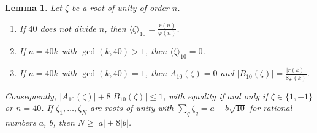 \documentclass[leqno]{article}
\renewcommand{\leq}{\ensuremath{\leqslant}}
\renewcommand{\geq}{\ensuremath{\geqslant}}
\newtheorem{lemma}[thm]{Lemma}
\numberwithin{equation}{section}
\begin{document}
\begin{lemma}
\label{lem:galois-average}
Let $\zeta$ be a root of unity of order $n$.
\begin{enumerate}
\item If $40$ does not divide $n$, then $\langle\zeta\rangle_{10} = \frac{r(n)}{\varphi(n)}$.
\item If $n = 40k$ with $\gcd(k,40) > 1$, then $\langle\zeta\rangle_{10} = 0$.
\item If $n = 40k$ with $\gcd(k,40) = 1$, then $A_{10}(\zeta) = 0$ and $|B_{10}(\zeta)| = \frac{|r(k)|}{8\varphi(k)}$.
\end{enumerate}
Consequently, $|A_{10}(\zeta)|+8|B_{10}(\zeta)| \leq 1$, with equality if and only if $\zeta \in \{1,-1\}$ or $n = 40$. If $\zeta_1, \ldots, \zeta_N$ are roots of unity with $\sum_q\zeta_q = a+b\sqrt{10}$ for rational numbers $a$, $b$, then $N \geq |a|+8|b|$.
\end{lemma}
\end{document}
